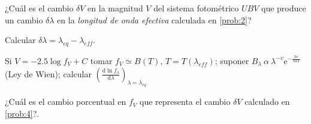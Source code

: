 \documentclass[12pt,a4paper]{practice}
\begin{document}
    \begin{problem}\label{prob:4}
        ¿Cuál es el cambio $\delta V$ en la magnitud $V$ del sistema fotométrico $UBV$ que produce un cambio $\delta\lambda$ en la \emph{longitud de onda efectiva} calculada en \ref{prob:2}?

        Calcular $\delta\lambda = {\lambda}_{eq} - {\lambda}_{eff}$.

        \begin{recommendation}
            Si $V = -2.5 \log f_V + C$ tomar $f_V \simeq B\left(T\right) $, $T=T\left({\lambda}_{eff}\right)$; suponer $B_{\lambda}\ \alpha\ {\lambda}^{-v} \mathrm{e}^{-\frac{hc}{\lambda k T}}$ (Ley de Wien); calcular $\left(\frac{\mathrm{d} \ln {f}_{\lambda}}{\mathrm{d}\lambda}\right)_{\lambda = {\lambda}_{eq}}$
        \end{recommendation}
    \end{problem}

    \begin{problem}\label{prob:5}
        ¿Cuál es el cambio porcentual en $f_V$ que representa el cambio $\delta V$ calculado en \ref{prob:4}?.
    \end{problem}
\end{document}
